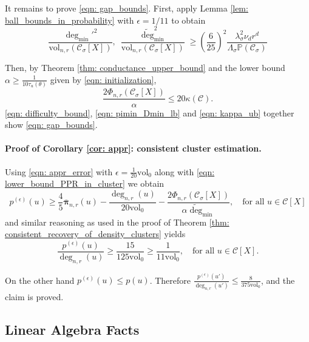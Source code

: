 \documentclass{article}
\newcommand{\vol}{\mathrm{vol}}
\newcommand{\1}{\mathbf{1}}
\newcommand{\pbf}{p}        %
\newcommand{\pibf}{\bm{\pi}}
\newcommand{\Xbf}{X}             %
\newcommand{\Pbb}{\mathbb{P}}
\newcommand{\Cset}{\mathcal{C}}
\newcommand{\Csig}{\Cset_{\sigma}}
\newcommand{\degminpr}{\deg_{\min}'}
\newcommand{\degminwt}{\widetilde{\deg}_{\min}}
\theoremstyle{aldenthm}
\theoremstyle{aldenrmrk}
\begin{document}
It remains to prove \eqref{eqn: gap_bounds}. First, apply Lemma \ref{lem: ball_bounds_in_probability} with $\epsilon = 1/11$ to obtain
\begin{equation}
\label{eqn: pimin_Dmin_lb}
\frac{\degminpr^2}{\vol_{n,r}(\Csig[\Xbf])},~ \frac{\degminwt^2}{\vol_{n,r}(\Csig[\Xbf])} \geq \left(\frac{6}{25}\right)^2 \frac{\lambda_{\sigma}^2 \nu_d r^d}{\Lambda_{\sigma}\Pbb(\Csig)}  
\end{equation}

Then, by Theorem \ref{thm: conductance_upper_bound} and the lower bound $\alpha \geq \frac{1}{10 \tau_{u}(\theta)}$ given by \eqref{eqn: initialization},
\begin{equation}
\label{eqn: difficulty_bound}
\frac{2\Phi_{n,r}(\Csig[\Xbf])}{\alpha} \leq 20\kappa(\Cset).
\end{equation}
\eqref{eqn: difficulty_bound}, \eqref{eqn: pimin_Dmin_lb} and \eqref{eqn: kappa_ub} together show \eqref{eqn: gap_bounds}.

\paragraph{Proof of Corollary \ref{cor: appr}: consistent cluster estimation.}

Using \eqref{eqn: appr_error} with $\epsilon = \frac{1}{20}\vol_0$ along with \eqref{eqn: lower_bound_PPR_in_cluster} we obtain
\begin{equation*}
\pbf^{(\epsilon)}(u) \geq \frac{4}{5} \overline{\pibf}_{n,r}(u) - \frac{\deg_{n,r}(u)}{20\vol_0} - \frac{2\Phi_{n,r}(\Csig[\Xbf])}{\alpha \degminwt}, \quad \textrm{for all $u \in \Cset[\Xbf]$}
\end{equation*}
and similar reasoning as used in the proof of Theorem \ref{thm: consistent_recovery_of_density_clusters} yields
\begin{equation*}
\frac{\pbf^{(\epsilon)}(u)}{\deg_{n,r}(u)} \geq \frac{15}{125\vol_0} \geq \frac{1}{11 \vol_0}, \quad \textrm{for all $u \in \Cset[\Xbf]$}.
\end{equation*}

On the other hand $\pbf^{(\epsilon)}(u) \leq \pbf(u)$. Therefore $\frac{\pbf^{(\epsilon)}(u')}{\deg_{n,r}(u')} \leq \frac{8}{375\vol_0}$, and the claim is proved.


\subsection{Linear Algebra Facts}
\label{sec: linalg}
\end{document}
